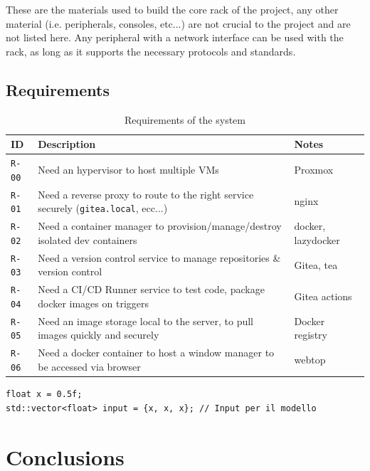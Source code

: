 \documentclass[a4paper, 11pt, twoside]{report}
\newcommand{\blankpage}{
    \clearpage
    \thispagestyle{empty} %
    \hbox{}               %
    \newpage
}
\begin{document}
These are the materials used to build the core rack of the project, any other material (i.e. peripherals, consoles, 
etc...) are not crucial to the project and are not listed here. Any peripheral with a network interface can be used with
the rack, as long as it supports the necessary protocols and standards.

\section{Requirements}
\begin{table}[h]
\centering
\begin{tabular}{@{}lp{10cm}l@{}}
\toprule
\textbf{ID} & \textbf{Description} & \textbf{Notes} \\ \midrule
\texttt{R-00} & Need an hypervisor to host multiple VMs & Proxmox\\
\texttt{R-01} & Need a reverse proxy to route to the right service securely (\texttt{gitea.local}, ecc...) & nginx\\
\texttt{R-02} & Need a container manager to provision/manage/destroy isolated dev containers & docker, lazydocker\\
\texttt{R-03} & Need a version control service to manage repositories \& version control & Gitea, tea\\
\texttt{R-04} & Need a CI/CD Runner service to test code, package docker images on triggers & Gitea actions\\
\texttt{R-05} & Need an image storage local to the server, to pull images quickly and securely & Docker registry\\
\texttt{R-06} & Need a docker container to host a window manager to be accessed via browser  & webtop\\
\bottomrule
\end{tabular}
\caption{Requirements of the system}
\end{table}

\begin{verbatim}
float x = 0.5f;
std::vector<float> input = {x, x, x}; // Input per il modello
\end{verbatim}

\chapter{Conclusions}

\blankpage
{}
\printglossary[title=Glossary, toctitle=Glossary]

\blankpage
\printbibliography[heading=bibintoc, title=Sitography]
\end{document}
